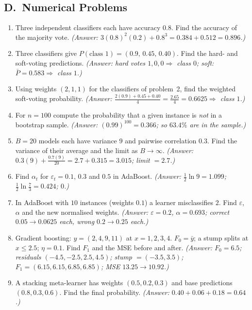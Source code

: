 \subsection*{D.\ Numerical Problems}
\begin{enumerate}
  \item Three independent classifiers each have accuracy $0.8$. Find the accuracy of the majority vote. \textit{(Answer: $3(0.8)^2(0.2)+0.8^3=0.384+0.512=0.896$.)}
  \item Three classifiers give $P(\text{class }1)=(0.9,\,0.45,\,0.40)$. Find the hard- and soft-voting predictions. \textit{(Answer: hard votes $1,0,0\Rightarrow$ class $0$; soft: $\bar P=0.583\Rightarrow$ class $1$.)}
  \item Using weights $(2,1,1)$ for the classifiers of problem~2, find the weighted soft-voting probability. \textit{(Answer: $\frac{2(0.9)+0.45+0.40}{4}=\frac{2.65}{4}=0.6625\Rightarrow$ class $1$.)}
  \item For $n=100$ compute the probability that a given instance is \emph{not} in a bootstrap sample. \textit{(Answer: $(0.99)^{100}=0.366$; so $63.4\%$ are in the sample.)}
  \item $B=20$ models each have variance $9$ and pairwise correlation $0.3$. Find the variance of their average and the limit as $B\to\infty$. \textit{(Answer: $0.3(9)+\frac{0.7(9)}{20}=2.7+0.315=3.015$; limit $=2.7$.)}
  \item Find $\alpha_t$ for $\varepsilon_t=0.1$, $0.3$ and $0.5$ in AdaBoost. \textit{(Answer: $\frac12\ln9=1.099$; $\frac12\ln\frac73=0.424$; $0$.)}
  \item In AdaBoost with $10$ instances (weights $0.1$) a learner misclassifies $2$. Find $\varepsilon$, $\alpha$ and the new normalised weights. \textit{(Answer: $\varepsilon=0.2$, $\alpha=0.693$; correct $0.05\to0.0625$ each, wrong $0.2\to0.25$ each.)}
  \item Gradient boosting: $y=(2,4,9,11)$ at $x=1,2,3,4$. $F_0=\bar y$; a stump splits at $x\le2.5$; $\eta=0.1$. Find $F_1$ and the MSE before and after. \textit{(Answer: $F_0=6.5$; residuals $(-4.5,-2.5,2.5,4.5)$; stump $=(-3.5,3.5)$; $F_1=(6.15,6.15,6.85,6.85)$; MSE $13.25\to10.92$.)}
  \item A stacking meta-learner has weights $(0.5,0.2,0.3)$ and base predictions $(0.8,0.3,0.6)$. Find the final probability. \textit{(Answer: $0.40+0.06+0.18=0.64$.)}
\end{enumerate}

